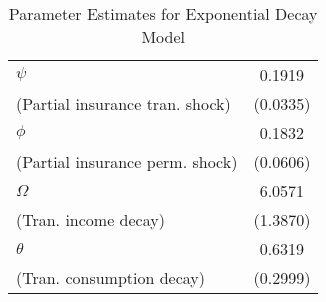 \begin{table}  
\caption{Parameter Estimates for Exponential Decay Model}  
\label{table:ExpIncDecay}  
\begin{center}  
\begin{tabular}{lc}  
\toprule  
 $\psi$ &                               0.1919  
\\ (Partial insurance tran. shock) &      (0.0335) 
\\  $\phi$ &                               0.1832  
\\ (Partial insurance perm. shock) &      (0.0606) 
\\ $\Omega$ &                               6.0571  
\\ (Tran. income decay) &      (1.3870) 
\\ $\theta$ &                               0.6319  
\\ (Tran. consumption decay) &      (0.2999) 
\\ \hline  
 \end{tabular}   
\end{center}  
\end{table}  
